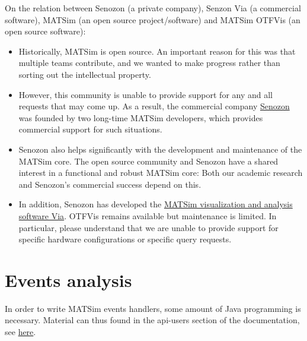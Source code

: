 On the relation between Senozon (a private company), Senzon Via (a commercial software), 
MATSim (an open source project/software) and MATSim OTFVis (an open source software):
\begin{itemize}\styleItemize
	\item Historically, MATSim is open source. An important reason for this was that multiple teams contribute, and we wanted to make progress rather than sorting out the intellectual property.
	\item However, this community is unable to provide support for any and all requests that may come up. As a result, the commercial company \href{http://www.senzon.com/}{Senozon} was founded by two long-time MATSim developers, which provides commercial support for such situations.
	\item Senozon also helps significantly with the development and maintenance of the MATSim core. The open source community and Senozon have a shared interest in a functional and robust MATSim core: Both our academic research and Senozon's commercial success depend on this.
	\item In addition, Senozon has developed the \href{http://senozon.com/products/via}{MATSim visualization and analysis software Via}.  OTFVis remains available but maintenance is limited. In  particular, please understand that we are unable to provide support for specific hardware configurations or specific query requests.
\end{itemize}

\section{Events analysis}

In  order to write MATSim events handlers, some amount of Java programming  is necessary. Material can thus found in the api-users section of the documentation, see \href{http://www.matsim.org/node/17}{here}.
